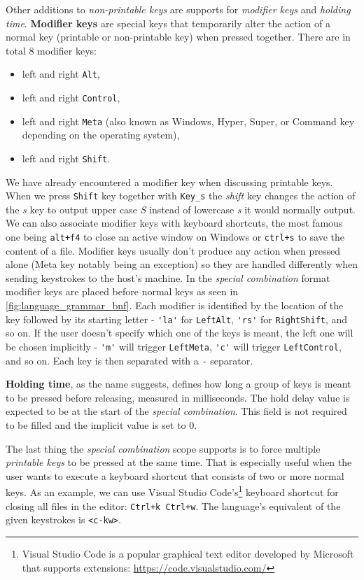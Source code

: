 Other additions to \emph{non-printable keys} are supports for \emph{modifier keys} and \emph{holding time}. \textbf{Modifier keys} are special keys that temporarily alter the action of a normal key (printable or non-printable key) when pressed together. There are in total 8 modifier keys:
\begin{itemize}
    \item left and right \verb|Alt|,
    \item left and right \verb|Control|,
    \item left and right \verb|Meta| (also known as Windows, Hyper, Super, or Command key depending on the operating system),
    \item left and right \verb|Shift|.
\end{itemize}
 We have already encountered a modifier key when discussing printable keys. When we press \verb|Shift| key together with \verb|Key_s| the \emph{shift} key changes the action of the \emph{s} key to output upper case \emph{S} instead of lowercase \emph{s} it would normally output. We can also associate modifier keys with keyboard shortcuts, the most famous one being \verb|alt+f4| to close an active window on Windows or \verb|ctrl+s| to save the content of a file. Modifier keys usually don't produce any action when pressed alone (Meta key notably being an exception) so they are handled differently when sending keystrokes to the host's machine. In the \emph{special combination} format modifier keys are placed before normal keys as seen in \autoref{fig:language_grammar_bnf}. Each modifier is identified by the location of the key followed by its starting letter \-- \verb|'la'| for \verb|LeftAlt|, \verb|'rs'| for \verb|RightShift|, and so on. If the user doesn't specify which one of the keys is meant, the left one will be chosen implicitly \-- \verb|'m'| will trigger \verb|LeftMeta|, \verb|'c'| will trigger \verb|LeftControl|, and so on. Each key is then separated with a \verb|-| separator.

\textbf{Holding time}, as the name suggests, defines how long a group of keys is meant to be pressed before releasing, measured in milliseconds. The hold delay value is expected to be at the start of the \emph{special combination}. This field is not required to be filled and the implicit value is set to 0.

The last thing the \emph{special combination} scope supports is to force multiple \emph{printable keys} to be pressed at the same time. That is especially useful when the user wants to execute a keyboard shortcut that consists of two or more normal keys. As an example, we can use Visual Studio Code's\footnote{Visual Studio Code is a popular graphical text editor developed by Microsoft that supports extensions: \url{https://code.visualstudio.com/}} keyboard shortcut for closing all files in the editor: \verb|Ctrl+k Ctrl+w|. The language's equivalent of the given keystrokes is \verb|<c-kw>|.

